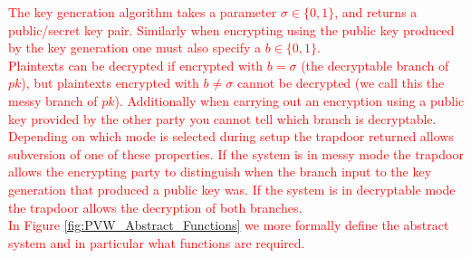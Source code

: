 \documentclass[ %
                    author={Nicholas Tutte},
                supervisor={Prof. Nigel Smart},
                    degree={MEng},
                     title={Secure Two Party Computation},
                  subtitle={A practical comparison of recent protocols},
                      type={Research - GG1K},
                      year={2015} ]{dissertation}
\begin{document}
					\textcolor{red}{The key generation algorithm takes a parameter $\sigma \in \{0, 1\}$, and returns a public/secret key pair. Similarly when encrypting using the public key produced by the key generation one must also specify a $b \in \{0, 1\}$.}\\

					\textcolor{red}{Plaintexts can be decrypted if encrypted with $b = \sigma$ (the decryptable branch of $pk$), but plaintexts encrypted with $b \neq \sigma$ cannot be decrypted (we call this the messy branch of $pk$). Additionally when carrying out an encryption using a public key provided by the other party you cannot tell which branch is decryptable.}\\

					\textcolor{red}{Depending on which mode is selected during setup the trapdoor returned allows subversion of one of these properties. If the system is in messy mode the trapdoor allows the encrypting party to distinguish when the branch input to the key generation that produced a public key was. If the system is in decryptable mode the trapdoor allows the decryption of both branches.}\\

					\textcolor{red}{In Figure \ref{fig:PVW_Abstract_Functions} we more formally define the abstract system and in particular what functions are required.}\\
\end{document}

